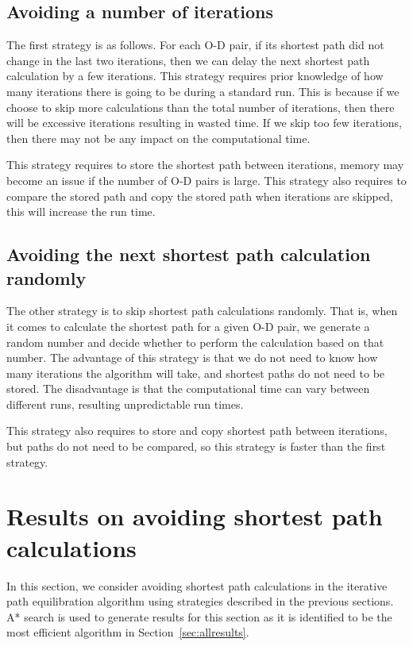\subsection{Avoiding a number of iterations}
The first strategy is as follows.
For each O-D pair,
if its shortest path did not change in the last two iterations,
then we can delay the next shortest path calculation by a few iterations.
This strategy requires prior knowledge of how many iterations there is going to be during a standard run.
This is because if we choose to skip more calculations than the total number of iterations,
then there will be excessive iterations resulting in wasted time.
If we skip too few iterations,
then there may not be any impact on the computational time.

This strategy requires to store the shortest path between iterations,
memory may become an issue if the number of O-D pairs is large.
This strategy also requires to compare the stored path and copy the stored path when iterations are skipped,
this will increase the run time.

\subsection{Avoiding the next shortest path calculation randomly}
The other strategy is to skip shortest path calculations randomly.
That is, when it comes to calculate the shortest path for a given O-D pair,
we generate a random number and decide whether to perform the calculation based on that number.
The advantage of this strategy is that we do not need to know how many iterations the algorithm will take,
and shortest paths do not need to be stored.
The disadvantage is that the computational time can vary between different runs,
resulting unpredictable run times.

This strategy also requires to store and copy shortest path between iterations,
but paths do not need to be compared, so this strategy is faster than the first strategy.

\section{Results on avoiding shortest path calculations}
In this section, we consider avoiding shortest path calculations in the iterative path equilibration algorithm using strategies described in the previous sections.
A* search is used to generate results for this section as it is identified to be the most efficient algorithm in Section~\ref{sec:allresults}.

